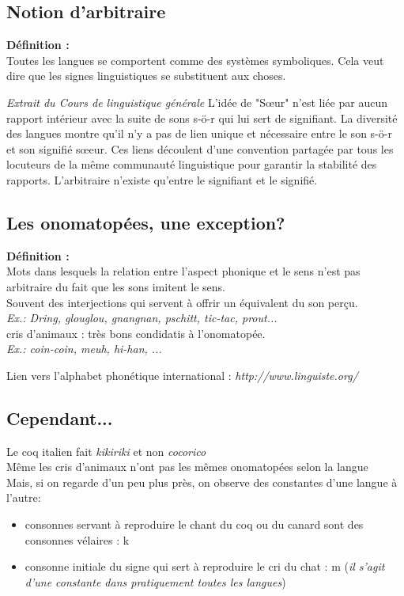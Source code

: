 \subsection{Notion d'arbitraire}
\textbf{Définition :}\\
   Toutes les langues se comportent comme des systèmes symboliques.
   Cela veut dire que les signes linguistiques se substituent aux choses.

\emph{Extrait du \textit{Cours de linguistique générale}}
L'idée de "Sœur" n'est liée par aucun rapport intérieur avec la suite de sons \/s-ö-r\/ qui lui sert de signifiant.
La diversité des langues montre qu'il n'y a pas de lien unique et nécessaire entre le son \/s-ö-r\/ et son signifié sœeur.
Ces liens découlent d'une convention partagée par tous les locuteurs de la même communauté linguistique pour garantir la stabilité des rapports.
L'arbitraire n'existe qu'entre le signifiant et le signifié.

\subsection{Les onomatopées, une exception?}
\textbf{Définition :}\\
      Mots dans lesquels la relation entre l'aspect phonique et le sens n'est pas arbitraire du fait que les sons imitent le sens.\\
      Souvent des interjections qui servent à offrir un équivalent du son perçu.\\
      \textit{Ex.: Dring, glouglou, gnangnan, pschitt, tic-tac, prout...}\\
      cris d'animaux : très bons condidatis à l'onomatopée.\\
      \textit{Ex.: coin-coin, meuh, hi-han, ...}

      Lien vers l'alphabet phonétique international : \textit{http://www.linguiste.org/}

\subsection{Cependant...}

Le coq italien fait \textit{kikiriki} et non \textit{cocorico}\\
Même les cris d'animaux n'ont pas les mêmes onomatopées selon la langue\\
Mais, si on regarde d'un peu plus près, on observe des constantes d'une langue à l'autre: \\
\begin{itemize}
         \item consonnes servant à reproduire le chant du coq ou du canard sont des consonnes vélaires : \/k\/
         \item consonne initiale du signe qui sert à reproduire le cri du chat : \/m\/ (\textit{il s'agit d'une constante dans pratiquement toutes les langues})
\end{itemize}

